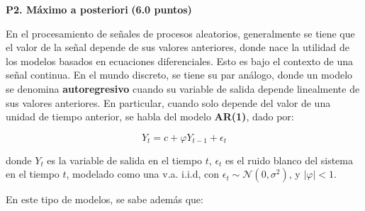 \documentclass[11pt,letterpaper]{article}
\begin{document}




\vspace{5 mm}
\noindent\textbf{P2. Máximo a posteriori} \textbf{(6.0 puntos)}
\vspace{5 mm}

En el procesamiento de señales de procesos aleatorios, generalmente se tiene que el valor de la señal depende de sus valores anteriores, donde nace la utilidad de los modelos basados en ecuaciones diferenciales. Esto es bajo el contexto de una señal continua. En el mundo discreto, se tiene su par análogo, donde un modelo se denomina \textbf{autoregresivo} cuando su variable de salida depende linealmente de sus valores anteriores. En particular, cuando solo depende del valor de una unidad de tiempo anterior, se habla del modelo \textbf{AR(1)}, dado por:

\begin{equation*}
    Y_t = c + \varphi Y_{t-1} + \epsilon_t
\end{equation*}

\noindent donde $Y_t$ es la variable de salida en el tiempo $t$, $\epsilon_t$ es el ruido blanco del sistema en el tiempo $t$, modelado como una v.a. i.i.d, con  $\epsilon_t \sim \mathcal{N}(0, \sigma^2)$, y $|\varphi| < 1$.

En este tipo de modelos, se sabe además que:
\end{document}
